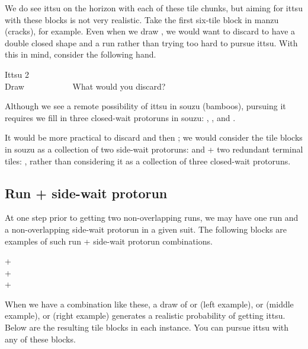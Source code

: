 \noindent
We do see {\jap ittsu} on the horizon with each of these tile chunks, but aiming for {\jap ittsu} with these blocks is not very realistic. Take the first six-tile block in {\jap manzu} (cracks), for example. Even when we draw {\LARGE{}}, we would want to discard {\LARGE{}} to have a double closed shape {\LARGE{}} and a run {\LARGE {}} rather than trying too hard to pursue {\jap ittsu}. 
With this in mind, consider the following hand. 

\begin{itembox}[r]{{\jap Ittsu} 2}
\bp
{}~\\
\hfill\footnotesize{Draw~~~~~~~~~~~}
\ep
\vspace{-17pt}What would you discard? \vspace{-5pt}
\end{itembox}
\noindent
Although we see a remote possibility of {\jap ittsu} in {\jap souzu} (bamboos), pursuing it requires we fill in three closed-wait protoruns in {\jap souzu}: {\LARGE{}}, {\LARGE{}}, and {\LARGE{}}.

\bigskip
It would be more practical to discard {\LARGE{}} and then {\LARGE{}}; we would consider the tile blocks in {\jap souzu} as a collection of two side-wait protoruns: {\LARGE{}} and {\LARGE{}} + two redundant terminal tiles: {\LARGE{} }, rather than considering it as a collection of three closed-wait protoruns.

\bigskip
\subsection{Run + side-wait protorun}

At one step prior to getting two non-overlapping runs, we may have one run and a non-overlapping side-wait protorun in a given suit. The following blocks are examples of such run + side-wait protorun combinations.

\bigskip
{\begin{center}
{\Huge {}+}  \\ [\sep]
{\Huge {}+} \\ [\sep]
{\Huge {}+} 
\end{center}}

\noindent
When we have a combination like these, a draw of {\LARGE{}} or {\LARGE{}} (left example), {\LARGE{}} or {\LARGE{}} (middle example), {\LARGE{}} or {\LARGE{}} (right example) generates a realistic probability of getting {\jap ittsu}. Below are the resulting tile blocks in each instance. You can pursue {\jap ittsu} with any of these blocks. 

